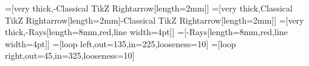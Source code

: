 \usepackage[utf8]{inputenc}
\usepackage[english]{babel}
\usepackage[hyphens]{url}
\usepackage{doi}
\usepackage{hyperref}
\usepackage{amsmath}
\usepackage{amssymb}
\usepackage{amsthm}
\usepackage{tikz}
\usepackage{natbib}
\usepackage{fancyhdr} %
\usepackage{textcomp} %
\usepackage{algorithm}
\usepackage{algpseudocode} %

\usepackage{minted}

\usetikzlibrary{arrows.meta}
\usetikzlibrary{shapes.multipart}
\usetikzlibrary{shapes.callouts}
=[very thick,-{Classical TikZ Rightarrow[length=2mm]}]
=[very thick,{Classical TikZ Rightarrow[length=2mm]}-{Classical TikZ Rightarrow[length=2mm]}]
=[very thick,-{Rays[length=8mm,red,line width=4pt]}]
=[-{Rays[length=8mm,red,line width=4pt]}]
=[loop left,out=135,in=225,looseness=10]
=[loop right,out=45,in=325,looseness=10]


\newcommand{\inlineslide}[1]{
    \refstepcounter{inlineslides}
    \pagebreak[3]\vspace{1em}\noindent
    \fbox{
      \begin{minipage}[t]{9cm}
        \begin{center}
          \includeslide[width=9cm,page=0]{#1} \\
        \end{center}
      \end{minipage}
    }
    \hspace{1em}\textsf{Slide \theinlineslides} \par\vspace{1em}\pagebreak[3]
}
\def\inlineslidesautorefname{Slide}%

